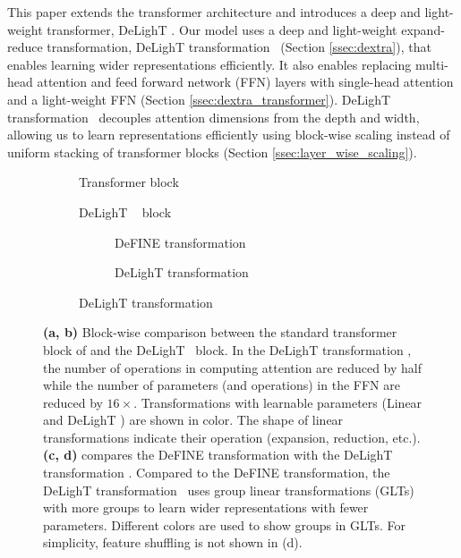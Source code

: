 This paper extends the transformer architecture and introduces a deep and light-weight transformer, DeLighT . Our model uses a deep and light-weight expand-reduce transformation, DeLighT transformation ~(Section \ref{ssec:dextra}), that enables learning wider representations efficiently. It also enables replacing multi-head attention and feed forward network (FFN) layers with single-head attention and a light-weight FFN (Section \ref{ssec:dextra_transformer}). DeLighT transformation ~decouples attention dimensions from the depth and width, allowing us to learn representations efficiently using block-wise scaling instead of uniform stacking of transformer blocks (Section \ref{ssec:layer_wise_scaling}).
%
\begin{figure}[t!]
    \centering
    \begin{subfigure}[b]{0.35\columnwidth}
        \centering
        \resizebox{!}{160px}{
            \transformer
        }
        \caption{Transformer block}
        \label{fig:transformer_sa}
    \end{subfigure}
    \hfill
    \begin{subfigure}[b]{0.33\columnwidth}
        \centering
        \resizebox{!}{165px}{
            \redefine
        }
        \caption{DeLighT ~ block}
        \label{fig:redefine_transformer_sa}
    \end{subfigure}
    \hfill
    \begin{subfigure}[b]{0.3\columnwidth}
        \centering
        \begin{subfigure}[b]{\columnwidth}
            \centering
            \caption{DeFINE transformation}
            \label{fig:hgt}
            \end{subfigure}
            \vfill
            \begin{subfigure}[b]{\columnwidth}
            \centering
            \resizebox{!}{70px}{
                \invHGTShuffle
            }
            \caption{DeLighT transformation }
            \label{fig:ihgt}
        \end{subfigure}
    \end{subfigure}
    \caption{\textbf{(a, b)} Block-wise comparison between the standard transformer block of \citet{vaswani2017attention} and the DeLighT ~block. In the DeLighT transformation , the number of operations in computing attention are reduced by half while the number of parameters (and operations) in the FFN are reduced by $16\times$. Transformations with learnable parameters (\colorbox{cyan!40}{Linear} and \colorbox{green!20}{DeLighT }) are shown in color. The shape of linear transformations indicate their operation (expansion, reduction, etc.). \textbf{(c, d)} compares the DeFINE transformation \citep{mehta2020DeFINE} with the DeLighT transformation . Compared to the DeFINE transformation, the DeLighT transformation ~uses group linear transformations (GLTs) with more groups to learn wider representations with fewer parameters. Different colors are used to show groups in GLTs. For simplicity, feature shuffling is not shown in (d).}
    \label{fig:compare_tam_ram_sa}
\end{figure}
%
